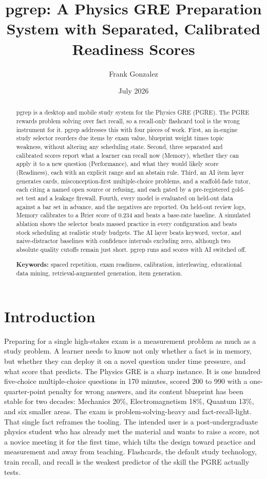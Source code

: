 \documentclass[11pt]{article}
\title{\textbf{pgrep}: A Physics GRE Preparation System with Separated, Calibrated Readiness Scores}
\author{Frank Gonzalez}
\date{July 2026}
\begin{document}
\maketitle

\begin{abstract}
pgrep is a desktop and mobile study system for the Physics GRE (PGRE). The PGRE
rewards problem solving over fact recall, so a recall-only flashcard tool is the
wrong instrument for it. pgrep addresses this with four pieces of work. First, an
in-engine study selector reorders due items by exam value, blueprint weight times
topic weakness, without altering any scheduling state. Second, three separated and
calibrated scores report what a learner can recall now (Memory), whether they can
apply it to a new question (Performance), and what they would likely score
(Readiness), each with an explicit range and an abstain rule. Third, an AI item
layer generates cards, misconception-first multiple-choice problems, and a
scaffold-fade tutor, each citing a named open source or refusing, and each gated by
a pre-registered gold-set test and a leakage firewall. Fourth, every model is
evaluated on held-out data against a bar set in advance, and the negatives are
reported. On held-out review logs, Memory calibrates to a Brier score of 0.234 and
beats a base-rate baseline. A simulated ablation shows the selector beats massed
practice in every configuration and beats stock scheduling at realistic study
budgets. The AI layer beats keyword, vector, and naive-distractor baselines with
confidence intervals excluding zero, although two absolute quality cutoffs remain
just short. pgrep runs and scores with AI switched off.

\textbf{Keywords:} spaced repetition, exam readiness, calibration, interleaving,
educational data mining, retrieval-augmented generation, item generation.
\end{abstract}

\section{Introduction}

Preparing for a single high-stakes exam is a measurement problem as much as a study
problem. A learner needs to know not only whether a fact is in memory, but whether
they can deploy it on a novel question under time pressure, and what score that
predicts. The Physics GRE is a sharp instance. It is one hundred five-choice
multiple-choice questions in 170 minutes, scored 200 to 990 with a one-quarter-point
penalty for wrong answers, and its content
blueprint has been stable for two decades: Mechanics 20\%, Electromagnetism 18\%,
Quantum 13\%, and six smaller areas. The exam is problem-solving-heavy and
fact-recall-light. That single fact reframes the tooling. The intended user is a
post-undergraduate physics student who has already met the material and wants to raise a
score, not a novice meeting it for the first time, which tilts the design toward
practice and measurement and away from teaching. Flashcards, the default
study technology, train recall, and recall is the weakest predictor of the skill the
PGRE actually tests.
\end{document}
